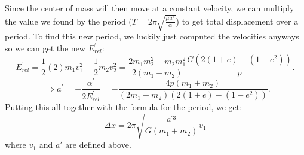 \documentclass[letterpaper, reqno,11pt]{article}
\begin{document}
Since the center of mass will then move at a constant velocity, we can multiply the value we found by the period ($T=2\pi\sqrt{\frac{\mu a^3}{\alpha}} $) to get total displacement over a period. To find this new period, we luckily just computed the velocities anyways so we can get the new $E_{rel}^\prime$: 
 \[
E_{rel}^{\prime}=\frac{1}{2}(2)m_1v_1^2+\frac{1}{2}m_2v_2^2=\frac{2m_1m_2^2+m_2m_1^2}{2(m_1+m_2)}\frac{G\left( 2(1+e)-(1-e^2) \right) }{p}
.\]
\[
\implies a^\prime=-\frac{\alpha^\prime}{2E_{rel}^\prime}=-\frac{4p(m_1+m_2)}{\left( 2m_1+m_2 \right)\left( 2(1+e)-(1-e^2) \right)  }
.\]
Putting this all together with the formula for the period, we get:
\[
\Delta x=2\pi\sqrt{\frac{ a^{\prime 3}}{G(m_1+m_2)}}v_1
\]
where $v_1$ and $a'$ are defined above. 
\end{document}
